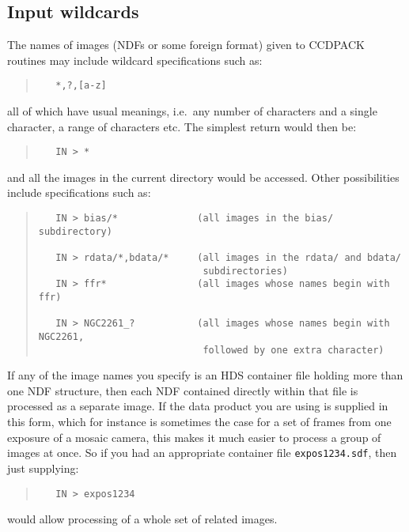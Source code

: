 \documentclass[twoside,11pt]{article}
\renewcommand{\_}{\texttt{\symbol{95}}}
\newenvironment{myquote}{\begin{quote}\begin{small}}{\end{small}\end{quote}}
\newcommand{\text}[1]{{\small \tt #1}}
\begin{document}
\subsection{Input wildcards}
The names of images (NDFs or some foreign format) given to CCDPACK
routines may include wildcard specifications such as:
\begin{myquote}
\begin{verbatim}
   *,?,[a-z]
\end{verbatim}
\end{myquote}
all of which have usual meanings, i.e.\ any number of characters and a
single character, a range of characters etc.
The simplest return would then be:
\begin{myquote}
\begin{verbatim}
   IN > *
\end{verbatim}
\end{myquote}
and all the images in the current directory would be accessed. Other
possibilities include specifications such as:
\begin{myquote}
\begin{verbatim}
   IN > bias/*              (all images in the bias/ subdirectory)

   IN > rdata/*,bdata/*     (all images in the rdata/ and bdata/
                             subdirectories)
   IN > ffr*                (all images whose names begin with ffr)

   IN > NGC2261_?           (all images whose names begin with NGC2261,
                             followed by one extra character)
\end{verbatim}
\end{myquote}

If any of the image names you specify is an HDS container file
holding more than one NDF structure, then each NDF contained directly 
within that file is processed as a separate image.  
If the data product you are using is supplied in this form, 
which for instance is sometimes the case for a set of frames 
from one exposure of a mosaic camera, 
this makes it much easier to process a group of images at once.
So if you had an 
appropriate container file \text{expos1234.sdf}, then just supplying:
\begin{myquote}
\begin{verbatim}
   IN > expos1234
\end{verbatim}
\end{myquote}
would allow processing of a whole set of related images.
\end{document}
